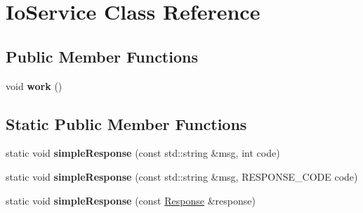 \hypertarget{class_io_service}{}\section{Io\+Service Class Reference}
\label{class_io_service}
\subsection*{Public Member Functions}
\begin{DoxyCompactItemize}
\item 
\mbox{\label{class_io_service_a567121c3f219b94b076d622d6881c0ef}} 
void {\bfseries work} ()
\end{DoxyCompactItemize}
\subsection*{Static Public Member Functions}
\begin{DoxyCompactItemize}
\item 
\mbox{\label{class_io_service_a707f96e25e98c5caaace1100095e374a}} 
static void {\bfseries simple\+Response} (const std\+::string \&msg, int code)
\item 
\mbox{\label{class_io_service_a73cdc0bb026f8dae7be3649b269ad541}} 
static void {\bfseries simple\+Response} (const std\+::string \&msg, R\+E\+S\+P\+O\+N\+S\+E\+\_\+\+C\+O\+DE code)
\item 
\mbox{\label{class_io_service_a3c3ec538c9632b5aff0d4770a1c5822e}} 
static void {\bfseries simple\+Response} (const \hyperlink{class_response}{Response} \&response)
\end{DoxyCompactItemize}
